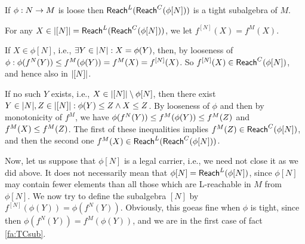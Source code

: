 
\begin{Fact}
If $\phi:N\rightarrow M$ is loose then ${\sf Reach}^{L}_{}({\sf Reach}^{C}_{}(\phi[N]))$ is
a tight subalgebra of $M$.
\end{Fact}
\begin{Proof}
For any $X\in|[N]|={\sf Reach}^{L}_{}({\sf Reach}^{C}_{}(\phi[N]))$, we let $f^{[N]}(X)=f^M(X)$. 

If $X\in\phi[N]$, i.e., $\exists Y\in|N|: X=\phi(Y)$, then, by
looseness of $\phi: \phi(f^N(Y))\leq
f^M(\phi(Y))=f^M(X)=f^{[N]}(X)$. So $f^{[N]}(X)\in {\sf Reach}^{C}_{}(\phi[N])$, and hence also in $|[N]|$.

If no such $Y$ exists, i.e., $X\in|[N]|\setminus \phi[N]$, then
there exist $Y\in|N|, Z\in |[N]|: \phi(Y)\leq Z \land X\leq
Z$. By looseness of $\phi$ and then by monotonicity of $f^M$, we have
$\phi(f^N(Y))\leq f^M(\phi(Y))\leq f^M(Z)$ and $f^M(X)\leq f^M(Z)$. The
first of these inequalities implies $f^M(Z)\in{\sf Reach}^{C}_{}(\phi[N])$,
and then the second one $f^M(X)\in{\sf Reach}^{L}_{}({\sf Reach}^{C}_{}(\phi[N]))$.
\end{Proof}

Now, let us suppose that $\phi[N]$ is a legal carrier, i.e., we need
not close it as we did above. It does not necessarily mean that
$\phi[N]={\sf Reach}^{L}_{}(\phi[N])$, since $\phi[N]$ may contain fewer
elements than all those which are L-reachable in $M$ from $\phi[N]$.
We now try to define the subalgebra $[N]$ by
$f^{[N]}(\phi(Y))=\phi(f^N(Y))$.  Obviously, this goeas fine when
$\phi$ is tight, since then $\phi(f^N(Y))=f^M(\phi(Y))$, and we are in
the first case of fact \ref{fa:TCsub}. 

